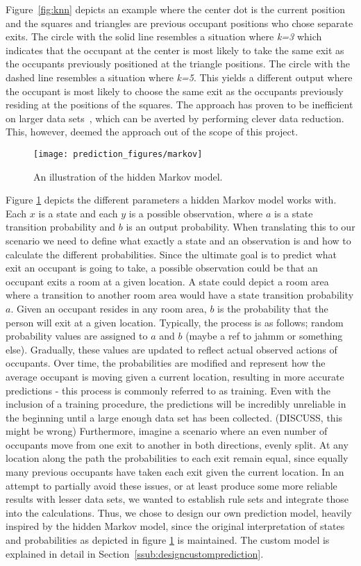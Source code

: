 Figure~\ref{fig:knn} depicts an example where the center dot is the current position and the squares and triangles are previous occupant positions who chose separate exits. The circle with the solid line resembles a situation where \emph{k=3} which indicates that the occupant at the center is most likely to take the same exit as the occupants previously positioned at the triangle positions. The circle with the dashed line resembles a situation where \emph{k=5}. This yields a different output where the occupant is most likely to choose the same exit as the occupants previously residing at the positions of the squares. The approach has proven to be inefficient on larger data sets~\cite{bhatia}, which can be averted by performing clever data reduction. This, however, deemed the approach out of the scope of this project.
\begin{figure}
\centering
\texttt{[image: prediction\_figures/markov]}
\caption{An illustration of the hidden Markov model.}
\label{fig:markov}
\end{figure}

Figure \ref{fig:markov} depicts the different parameters a hidden Markov model works with. Each \(x\) is a state and each \(y\) is a possible observation, where \(a\) is a state transition probability and \(b\) is an output probability. When translating this to our scenario we need to define what exactly a state and an observation is and how to calculate the different probabilities. Since the ultimate goal is to predict what exit an occupant is going to take, a possible observation could be that an occupant exits a room at a given location. A state could depict a room area where a transition to another room area would have a state transition probability \(a\). Given an occupant resides in any room area, \(b\) is the probability that the person will exit at a given location. Typically, the process is as follows; random probability values are assigned to \(a\) and \(b\) (maybe a ref to jahmm or something else). Gradually, these values are updated to reflect actual observed actions of occupants. Over time, the probabilities are modified and represent how the average occupant is moving given a current location, resulting in more accurate predictions - this process is commonly referred to as training. Even with the inclusion of a training procedure, the predictions will be incredibly unreliable in the beginning until a large enough data set has been collected. (DISCUSS, this might be wrong) Furthermore, imagine a scenario where an even number of occupants move from one exit to another in both directions, evenly split. At any location along the path the probabilities to each exit remain equal, since equally many previous occupants have taken each exit given the current location. In an attempt to partially avoid these issues, or at least produce some more reliable results with lesser data sets, we wanted to establish rule sets and integrate those into the calculations. Thus, we chose to design our own prediction model, heavily inspired by the hidden Markov model, since the original interpretation of states and probabilities as depicted in figure \ref{fig:markov} is maintained. The custom model is explained in detail in Section~\ref{ssub:designcustomprediction}. 

